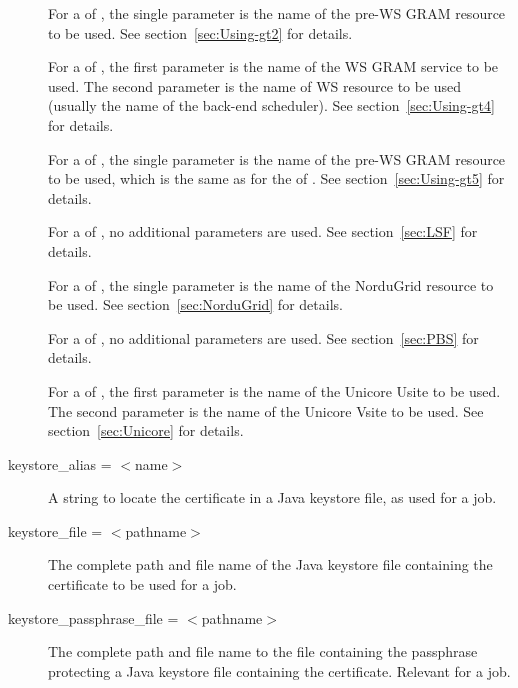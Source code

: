 \begin{description}
For a  of ,
the single parameter is the name of the pre-WS GRAM resource to be used.
See section~\ref{sec:Using-gt2} for details.

For a  of ,
the first parameter is the name of the WS GRAM service to be used.
The second parameter is the name of WS resource to be used (usually the
name of the back-end scheduler).
See section~\ref{sec:Using-gt4} for details.

For a  of ,
the single parameter is the name of the pre-WS GRAM resource to be used,
which is the same as for the  of .
See section~\ref{sec:Using-gt5} for details.

For a  of , no additional
parameters are used.
See section~\ref{sec:LSF} for details.

For a  of ,
the single parameter is the name of the NorduGrid resource to be used.
See section~\ref{sec:NorduGrid} for details.

For a  of , no additional
parameters are used.
See section~\ref{sec:PBS} for details.

For a  of ,
the first parameter is the name of the Unicore Usite to be used.
The second parameter is the name of the Unicore Vsite to be used.
See section~\ref{sec:Unicore} for details.



\item[keystore\_alias = $<$name$>$]
A string to locate the certificate in a Java keystore file,
as used for a  job.


\item[keystore\_file = $<$pathname$>$]
The complete path and file name of the Java keystore file
containing the certificate to be used for a  job.

\item[keystore\_passphrase\_file = $<$pathname$>$]
The complete path and file name
to the file containing the passphrase protecting a Java keystore
file containing the certificate.
Relevant for a  job.


\end{description}
